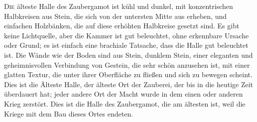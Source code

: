 
\lettrine{D}{ie} älteste Halle des Zaubergamot ist kühl und dunkel, mit konzentrischen Halbkreisen aus Stein, die sich von der untersten Mitte aus erheben, und einfachen Holzbänken, die auf diese erhöhten Halbkreise gesetzt sind. Es gibt keine Lichtquelle, aber die Kammer ist gut beleuchtet, ohne erkennbare Ursache oder Grund; es ist einfach eine brachiale Tatsache, dass die Halle gut beleuchtet ist. Die Wände wie der Boden sind aus Stein, dunklem Stein, einer eleganten und geheimnisvollen Verbindung von Gestein, die sehr schön anzusehen ist, mit einer glatten Textur, die unter ihrer Oberfläche zu fließen und sich zu bewegen scheint. Dies ist die Älteste Halle, der älteste Ort der Zauberei, der bis in die heutige Zeit überdauert hat; jeder andere Ort der Macht wurde in dem einen oder anderen Krieg zerstört. Dies ist die Halle des Zaubergamot, die am ältesten ist, weil die Kriege mit dem Bau dieses Ortes endeten.

